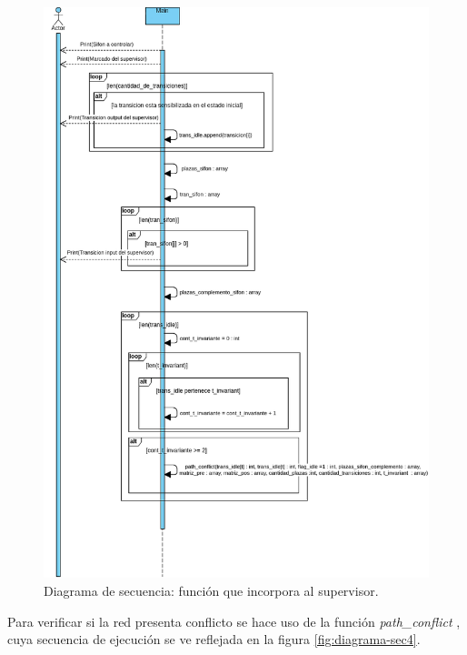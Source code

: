 \begin{figure}[H]
	\centering
	\includegraphics[width=\textwidth]{Figures/diagramasecuencia/Diagrama3.png}
	\caption{Diagrama de secuencia: función que incorpora al supervisor.}
	\label{fig:diagrama-sec3}
\end{figure}

Para verificar si la red presenta conflicto se hace uso de la función \textit{path\_conflict} , cuya secuencia de ejecución se ve reflejada en la figura \ref{fig:diagrama-sec4}.

